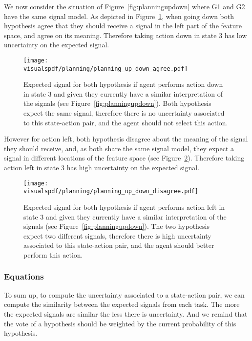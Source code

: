 We now consider the situation of Figure~\ref{fig:planningupdown} where G1 and G2 have the same signal model. As depicted in Figure~\ref{fig:uncertaintysignalupdownagree}, when going down both hypothesis agree that they should receive a signal in the left part of the feature space, and agree on its meaning. Therefore taking action down in state 3 has low uncertainty on the expected signal.

\begin{figure}[!htbp]
  \centering
  \texttt{[image: \\visualspdf/planning/planning\_up\_down\_agree.pdf]}
  \caption{Expected signal for both hypothesis if agent performs action down in state 3 and given they currently have a similar interpretation of the signals (see Figure~\ref{fig:planningupdown}). Both hypothesis expect the same signal, therefore there is no uncertainty associated to this state-action pair, and the agent should not select this action.}
  \label{fig:uncertaintysignalupdownagree}
\end{figure}

However for action left, both hypothesis disagree about the meaning of the signal they should receive, and, as both share the same signal model, they expect a signal in different locations of the feature space (see Figure~\ref{fig:uncertaintysignalupdowndisagree}). Therefore taking action left in state 3 has high uncertainty on the expected signal.

\begin{figure}[!htbp]
  \centering
  \texttt{[image: \\visualspdf/planning/planning\_up\_down\_disagree.pdf]}
  \caption{Expected signal for both hypothesis if agent performs action left in state 3 and given they currently have a similar interpretation of the signals (see Figure~\ref{fig:planningupdown}). The two hypothesis expect two different signals, therefore there is high uncertainty associated to this state-action pair, and the agent should better perform this action.}
  \label{fig:uncertaintysignalupdowndisagree}
\end{figure}


\subsubsection*{Equations}

To sum up, to compute the uncertainty associated to a state-action pair, we can compute the similarity between the expected signals from each task. The more the expected signals are similar the less there is uncertainty. And we remind that the vote of a hypothesis should be weighted by the current probability of this hypothesis.

